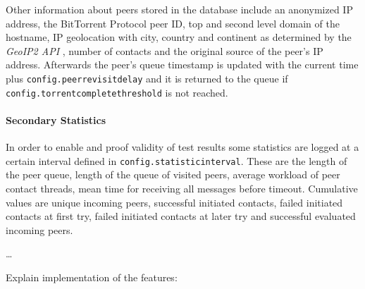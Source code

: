 \documentclass[10pt, a4paper, twoside]{scrartcl}
\renewcommand{\_}{\origunderscore\allowbreak}
\newcommand{\config}[1]{\texttt{config.\allowbreak #1}}
\begin{document}
Other information about peers stored in the database include an anonymized IP address, the BitTorrent Protocol peer ID, top and second level domain of the hostname, IP geolocation with city, country and continent as determined by the \emph{GeoIP2 API} \cite{geoip2-api}, number of contacts and the original source of the peer's IP address. Afterwards the peer's queue timestamp is updated with the current time plus \config{peer\_revisit\_delay} and it is returned to the queue if \config{torrent\_complete\_threshold} is not reached.

\paragraph{Secondary Statistics}
In order to enable and proof validity of test results some statistics are logged at a certain interval defined in \config{statistic\_interval}. These are the length of the peer queue, length of the queue of visited peers, average workload of peer contact threads, mean time for receiving all messages before timeout. Cumulative values are unique incoming peers, successful initiated contacts, failed initiated contacts at first try, failed initiated contacts at later try and successful evaluated incoming peers.

\dots

\noindent\hrulefill

Explain implementation of the features:
\end{document}
